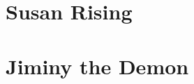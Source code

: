 \documentclass[ebook,12pt,oneside,openany]{memoir}
\begin{document}
\tableofcontents

\chapter{Susan Rising}

\chapter{Jiminy the Demon}


% 
\end{document}
